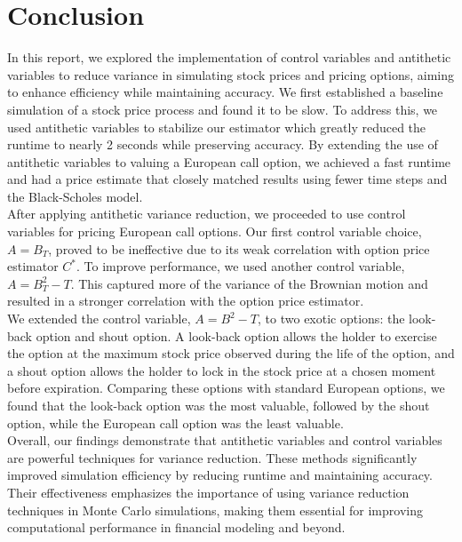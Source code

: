 \documentclass{report}
\begin{document}
\section*{Conclusion}
In this report, we explored the implementation of control variables and antithetic variables to reduce variance in simulating stock prices and pricing options, aiming to enhance efficiency while maintaining accuracy. We first established a baseline simulation of a stock price process and found it to be slow. To address this, we used antithetic variables to stabilize our estimator which greatly reduced the runtime to nearly 2 seconds while preserving accuracy. By extending the use of antithetic variables to valuing a European call option, we achieved a fast runtime and had a price estimate that closely matched results using fewer time steps and the Black-Scholes model. \\

After applying antithetic variance reduction, we proceeded to use control variables for pricing European call options. Our first control variable choice, $A=B_T$, proved to be ineffective due to its weak correlation with option price estimator \( C^* \). To improve performance, we used another control variable, \(A=B_T^2 - T\). This captured more of the variance of the Brownian motion and resulted in a stronger correlation with the option price estimator. \\

We extended the control variable, \(A=B^2 - T\), to two exotic options: the look-back option and shout option. A look-back option allows the holder to exercise the option at the maximum stock price observed during the life of the option, and a shout option allows the holder to lock in the stock price at a chosen moment before expiration. Comparing these options with standard European options, we found that the look-back option was the most valuable, followed by the shout option, while the European call option was the least valuable. \\

Overall, our findings demonstrate that antithetic variables and control variables are powerful techniques for variance reduction. These methods significantly improved simulation efficiency by reducing runtime and maintaining accuracy. Their effectiveness emphasizes the importance of using variance reduction techniques in Monte Carlo simulations, making them essential for improving computational performance in financial modeling and beyond. \\
\end{document}
